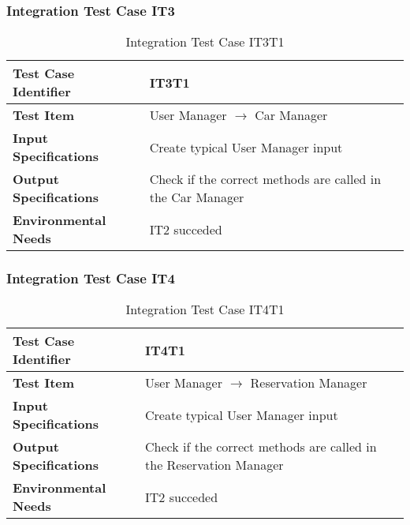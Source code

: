 \subsubsection{Integration Test Case IT3} \label{sssec:IT3}
\vspace{16pt}
\begin{table}[htbp]
\begin{center}
\renewcommand{\arraystretch}{1.5}
\begin{tabular}{l|p{}}
\hline
\textbf{Test Case Identifier} & IT3T1\\
\hline
\textbf{Test Item} & User Manager $\rightarrow$ Car Manager\\
\hline
\textbf{Input Specifications} & Create typical User Manager input \\
\hline
\textbf{Output Specifications} & Check if the correct methods are called in the Car Manager \\
\hline
\textbf{Environmental Needs} & IT2 succeded\\
\hline
\end{tabular}
\caption{Integration Test Case IT3T1}
\end{center}
\end{table}

\vspace{10pt}
\subsubsection{Integration Test Case IT4} \label{sssec:IT4}
\vspace{16pt}
\begin{table}[htbp]
\begin{center}
\renewcommand{\arraystretch}{1.5}
\begin{tabular}{l|p{}}
\hline
\textbf{Test Case Identifier} & IT4T1\\
\hline
\textbf{Test Item} & User Manager $\rightarrow$ Reservation Manager\\
\hline
\textbf{Input Specifications} & Create typical User Manager input \\
\hline
\textbf{Output Specifications} & Check if the correct methods are called in the Reservation Manager \\
\hline
\textbf{Environmental Needs} & IT2 succeded\\
\hline
\end{tabular}
\caption{Integration Test Case IT4T1}
\end{center}
\end{table}
\clearpage

